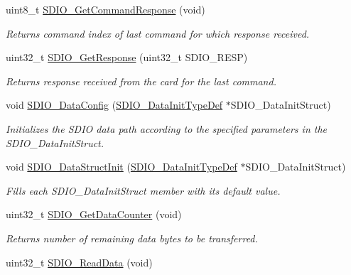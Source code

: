 \begin{DoxyCompactItemize}
uint8\+\_\+t \hyperlink{group___s_d_i_o___exported___functions_ga9badf271c818e09da301d715c4ad0e5b}{S\+D\+I\+O\+\_\+\+Get\+Command\+Response} (void)
\begin{DoxyCompactList}\small\item\em Returns command index of last command for which response received. \end{DoxyCompactList}\item 
uint32\+\_\+t \hyperlink{group___s_d_i_o___exported___functions_ga5c1e859511840e8cca6a9a768bce220b}{S\+D\+I\+O\+\_\+\+Get\+Response} (uint32\+\_\+t S\+D\+I\+O\+\_\+\+R\+E\+SP)
\begin{DoxyCompactList}\small\item\em Returns response received from the card for the last command. \end{DoxyCompactList}\item 
void \hyperlink{group___s_d_i_o___exported___functions_gad65d896ae919683585bda44a1e2afae4}{S\+D\+I\+O\+\_\+\+Data\+Config} (\hyperlink{struct_s_d_i_o___data_init_type_def}{S\+D\+I\+O\+\_\+\+Data\+Init\+Type\+Def} $\ast$S\+D\+I\+O\+\_\+\+Data\+Init\+Struct)
\begin{DoxyCompactList}\small\item\em Initializes the S\+D\+IO data path according to the specified parameters in the S\+D\+I\+O\+\_\+\+Data\+Init\+Struct. \end{DoxyCompactList}\item 
void \hyperlink{group___s_d_i_o___exported___functions_gaa83209c09e921521aca2587fb5b22ea2}{S\+D\+I\+O\+\_\+\+Data\+Struct\+Init} (\hyperlink{struct_s_d_i_o___data_init_type_def}{S\+D\+I\+O\+\_\+\+Data\+Init\+Type\+Def} $\ast$S\+D\+I\+O\+\_\+\+Data\+Init\+Struct)
\begin{DoxyCompactList}\small\item\em Fills each S\+D\+I\+O\+\_\+\+Data\+Init\+Struct member with its default value. \end{DoxyCompactList}\item 
uint32\+\_\+t \hyperlink{group___s_d_i_o___exported___functions_ga7a28aaa2c25a9a5a8db1f49b0e8c9d0a}{S\+D\+I\+O\+\_\+\+Get\+Data\+Counter} (void)
\begin{DoxyCompactList}\small\item\em Returns number of remaining data bytes to be transferred. \end{DoxyCompactList}\item 
uint32\+\_\+t \hyperlink{group___s_d_i_o___exported___functions_ga4e8ac755ef3c31ecd4ed2708df19187e}{S\+D\+I\+O\+\_\+\+Read\+Data} (void)

\end{DoxyCompactItemize}
